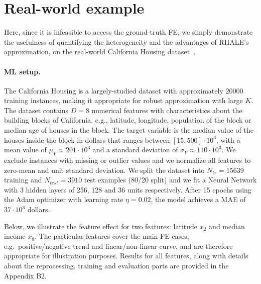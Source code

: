 \documentclass{ecai}  %
\newcommand{\paragraphb}{\vspace{-0.25cm}\paragraph}
\begin{document}
\section{Real-world example}
\label{sec:real-world-example}

Here, since it is infeasible to access the
ground-truth FE, we simply demonstrate the usefulness of quantifying the
heterogeneity and the advantages of RHALE's approximation, on the
real-world California Housing dataset~\cite{pace1997sparse}.

\paragraphb{ML setup.}
The California Housing is a largely-studied dataset with approximately
\(20000\) training instances, making it appropriate for robust
approximation with large \(K\).  The dataset contains \(D=8\)
numerical features with characteristics about the building blocks of
California, e.g., latitude, longitude, population of the block or
median age of houses in the block.  The target variable is the median
value of the houses inside the block in dollars that ranges between
\([15, 500] \cdot 10^3\), with a mean value of
\(\mu_Y \approx 201 \cdot 10^3 \) and a standard deviation of
\(\sigma_Y \approx 110 \cdot 10^3\). We exclude instances with missing
or outlier values and we normalize all features to zero-mean and unit
standard deviation. We split the dataset into \(N_{tr} = 15639\)
training and \(N_{test} = 3910\) test examples (80/20 split) and we
fit a Neural Network with 3 hidden layers of 256, 128 and 36 units
respectively.  After 15 epochs using the Adam optimizer with learning
rate \(\eta = 0.02\), the model achieves a MAE of \(37 \cdot 10^3\)
dollars.

Below, we illustrate the feature effect for two features: latitude
\(x_2\) and median income \(x_8\).  The particular features cover the
main FE cases, e.g.~positive/negative trend and linear/non-linear
curve, and are therefore appropriate for illustration purposes.
Results for all features, along with details about the reprocessing,
training and evaluation parts are provided in the Appendix B2.
\end{document}
